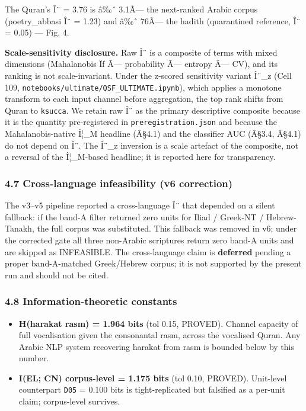 \documentclass[
]{article}
\providecommand{\tightlist}{%
  \setlength{\itemsep}{0pt}\setlength{\parskip}{0pt}}
\begin{document}
The Quran's Î¨ = 3.76 is â‰ˆ 3.1Ã--- the next-ranked Arabic corpus
(poetry\_abbasi Î¨ = 1.23) and â‰ˆ 76Ã--- the hadith (quarantined
reference, Î¨ = 0.05) --- Fig. 4.

\textbf{Scale-sensitivity disclosure.} Raw Î¨ is a composite of terms
with mixed dimensions (Mahalanobis Ïƒ Ã--- probability Ã--- entropy Ã---
CV), and its ranking is not scale-invariant. Under the z-scored
sensitivity variant Î¨\_z (Cell 109,
\texttt{notebooks/ultimate/QSF\_ULTIMATE.ipynb}), which applies a
monotone transform to each input channel before aggregation, the top
rank shifts from Quran to \texttt{ksucca}. We retain raw Î¨ as the
primary descriptive composite because it is the quantity pre-registered
in \texttt{preregistration.json} and because the Mahalanobis-native
Î¦\_M headline (Â§4.1) and the classifier AUC (Â§3.4, Â§4.1) do not
depend on Î¨. The Î¨\_z inversion is a scale artefact of the composite,
not a reversal of the Î¦\_M-based headline; it is reported here for
transparency.

\subsubsection{4.7 Cross-language infeasibility (v6
correction)}\label{cross-language-infeasibility-v6-correction}

The v3--v5 pipeline reported a cross-language Î¨ that depended on a
silent fallback: if the band-A filter returned zero units for Iliad /
Greek-NT / Hebrew-Tanakh, the full corpus was substituted. This fallback
was removed in v6; under the corrected gate all three non-Arabic
scriptures return zero band-A units and are skipped as INFEASIBLE. The
cross-language claim is \textbf{deferred} pending a proper
band-A-matched Greek/Hebrew corpus; it is not supported by the present
run and should not be cited.

\subsubsection{4.8 Information-theoretic
constants}\label{information-theoretic-constants}

\begin{itemize}
\tightlist
\item
  \textbf{H(harakat \textbar{} rasm) = 1.964 bits} (tol 0.15, PROVED).
  Channel capacity of full vocalisation given the consonantal rasm,
  across the vocalised Quran. Any Arabic NLP system recovering harakat
  from rasm is bounded below by this number.
\item
  \textbf{I(EL; CN) corpus-level = 1.175 bits} (tol 0.10, PROVED).
  Unit-level counterpart \texttt{D05} = 0.100 bits is tight-replicated
  but falsified as a per-unit claim; corpus-level survives.
\end{itemize}
\end{document}
